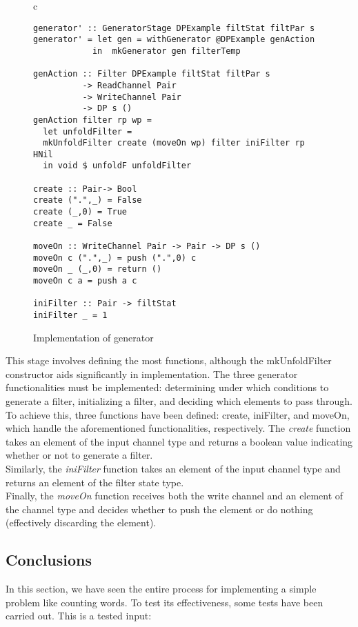 \begin{figure}[H]
    \begin{tabular}{c}
        \begin{lstlisting}
generator' :: GeneratorStage DPExample filtStat filtPar s
generator' = let gen = withGenerator @DPExample genAction
            in  mkGenerator gen filterTemp

genAction :: Filter DPExample filtStat filtPar s
          -> ReadChannel Pair
          -> WriteChannel Pair
          -> DP s ()
genAction filter rp wp =
  let unfoldFilter = 
  mkUnfoldFilter create (moveOn wp) filter iniFilter rp HNil
  in void $ unfoldF unfoldFilter

create :: Pair-> Bool
create (".",_) = False
create (_,0) = True
create _ = False

moveOn :: WriteChannel Pair -> Pair -> DP s ()
moveOn c (".",_) = push (".",0) c
moveOn _ (_,0) = return ()
moveOn c a = push a c

iniFilter :: Pair -> filtStat
iniFilter _ = 1
        \end{lstlisting}
    \end{tabular}
    \caption[{[Code]} Implementation 5]{Implementation of generator}
    \label{fig:HC20}
\end{figure}

This stage involves defining the most functions, although the mkUnfoldFilter constructor aids significantly in implementation.
The three generator functionalities must be implemented: determining under which conditions to generate a filter, initializing a filter, and deciding which elements to pass through.
To achieve this, three functions have been defined: create, iniFilter, and moveOn, which handle the aforementioned functionalities, respectively.
The \textit{create} function takes an element of the input channel type and returns a boolean value indicating whether or not to generate a filter. \\
Similarly, the \textit{iniFilter} function takes an element of the input channel type and returns an element of the filter state type. \\
Finally, the \textit{moveOn} function receives both the write channel and an element of the channel type and decides whether to push the element or do nothing (effectively discarding the element). 

\subsection{Conclusions}
In this section, we have seen the entire process for implementing a simple problem like counting words.
To test its effectiveness, some tests have been carried out. This is a tested input:

